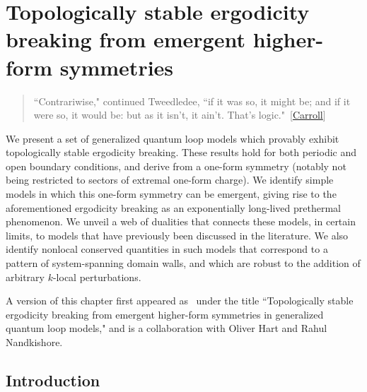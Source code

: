 
\chapter{Topologically stable ergodicity breaking from emergent higher-form symmetries}\label{chp:loops}

\begin{quotation}
	 ``Contrariwise," continued Tweedledee, ``if it was so, it might be; and if it were so, it would be: but as it isn't, it ain't. That's logic."~[\hyperlink{cite.\therefsection @Carroll2002Alice}{Carroll}]
\end{quotation}

We present a set of generalized quantum loop models which provably exhibit topologically stable ergodicity breaking. These results hold for both periodic and open boundary conditions, and derive from a one-form symmetry (notably not being restricted to sectors of extremal one-form charge). We identify simple models in which this one-form symmetry can be emergent, giving rise to the aforementioned ergodicity breaking as an exponentially long-lived prethermal phenomenon. We unveil a web of dualities that connects these models, in certain limits, to models that have previously been discussed in the literature. We also identify nonlocal conserved quantities in such models that correspond to a pattern of system-spanning domain walls, and which are robust to the addition of arbitrary $k$-local perturbations.



A version of this chapter first appeared as~\cite{Stahl2024Loops} under the title ``Topologically stable ergodicity breaking from emergent higher-form symmetries in generalized quantum loop models," and is a collaboration with Oliver Hart and Rahul Nandkishore.






\section{Introduction}

